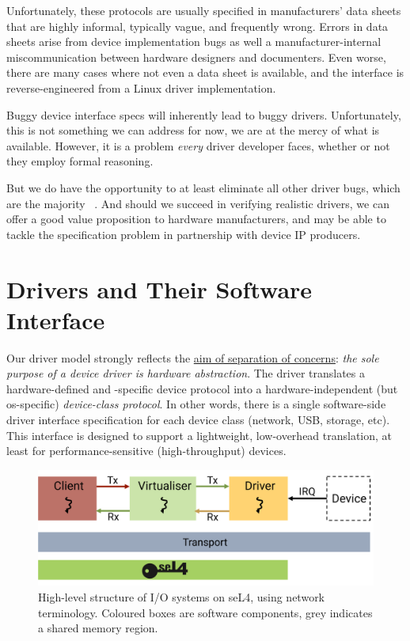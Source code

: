 \documentclass[a4paper,12pt]{report}
\newcommand{\figscale}{0.2}
\begin{document}
Unfortunately, these protocols are usually specified in manufacturers'
data sheets that are highly informal, typically vague, and frequently
wrong. Errors in data sheets arise from device implementation bugs as
well a manufacturer-internal miscommunication between hardware
designers and documenters. Even worse, there are many cases where not
even a data sheet is available, and the interface is
reverse-engineered from a Linux driver implementation.

Buggy device interface specs will inherently lead to buggy
drivers. Unfortunately, this is not something we can address for now,
we are at the mercy of what is available. However, it is a problem \emph{every}
driver developer faces, whether or not they employ formal reasoning.

But we do have the opportunity to at least eliminate all other driver
bugs, which are the majority ~\citep{Ryzhyk_CKH_09}. And should we
succeed in verifying realistic drivers, we can offer a good value
proposition to hardware manufacturers, and may be able to tackle the
specification problem in partnership with device IP producers.

\chapter{Drivers and Their Software Interface}\label{s:driver}

Our driver model strongly reflects the \hyperref[s:aims]{aim of separation of
  concerns}: \emph{the sole purpose of a device driver is hardware
abstraction}. The driver translates a hardware-defined and -specific
device protocol into a hardware-independent (but \gls{os}-specific)
\emph{device-class protocol}. In other words, there is a single
software-side driver interface specification for each device class (network,
USB, storage, etc). This interface is designed to support a
lightweight, low-overhead translation, at least for
performance-sensitive (high-throughput) devices.

\begin{figure}[th]
  \centering
  \includegraphics[scale=\figscale]{structure}
  \caption[High-level structure of I/O systems on seL4, using network
    terminology.]{High-level structure of I/O systems on seL4, using network
    terminology. Coloured boxes are software components, grey
    indicates a shared memory region.}
  \label{f:structure}
\end{figure}
\end{document}
